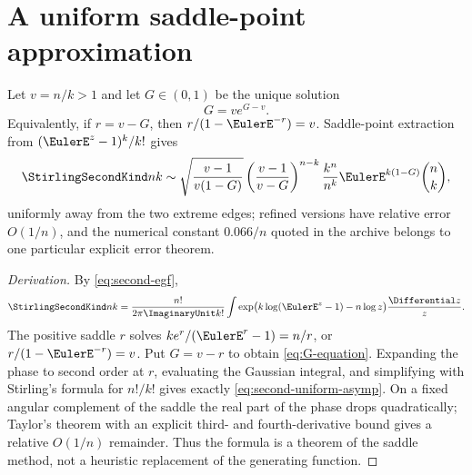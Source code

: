 \documentclass[11pt,a4paper,oneside,openany]{book}
\theoremstyle{definition}
\theoremstyle{remark}
\begin{document}
\section{A uniform saddle-point approximation}
Let $v=n/k>1$ and let $G\in(0,1)$ be the unique solution
\begin{equation}\label{eq:G-equation}
 G=ve^{G-v}.
\end{equation}
Equivalently, if $r=v-G$, then $r/(1-\EulerE^{-r})=v$.
Saddle-point extraction from $(\EulerE^z-1)^k/k!$ gives
\begin{equation}\label{eq:second-uniform-asymp}
 \StirlingSecondKind nk
 \sim
 \sqrt{\frac{v-1}{v(1-G)}}
 \left(\frac{v-1}{v-G}\right)^{n-k}
 \frac{k^n}{n^k}\EulerE^{k(1-G)}\binom nk,
\end{equation}
uniformly away from the two extreme edges; refined versions have relative error
$O(1/n)$, and the numerical constant $0.066/n$ quoted in the archive belongs to one
particular explicit error theorem.

\begin{proof}[Derivation]
By \cref{eq:second-egf},
\[
 \StirlingSecondKind nk=\frac{n!}{2\pi \ImaginaryUnit k!}\int
 \exp\bigl(k\log(\EulerE^z-1)-n\log z\bigr)\frac{\Differential z}{z}.
\]
The positive saddle $r$ solves
$ke^r/(\EulerE^r-1)=n/r$, or $r/(1-\EulerE^{-r})=v$.  Put $G=v-r$ to obtain
\cref{eq:G-equation}.  Expanding the phase to second order at $r$, evaluating the
Gaussian integral, and simplifying with Stirling's formula for $n!/k!$ gives exactly
\cref{eq:second-uniform-asymp}.  On a fixed angular complement of the saddle the
real part of the phase drops quadratically; Taylor's theorem with an explicit third-
and fourth-derivative bound gives a relative $O(1/n)$ remainder.  Thus the formula is
a theorem of the saddle method, not a heuristic replacement of the generating
function.
\end{proof}
\end{document}
